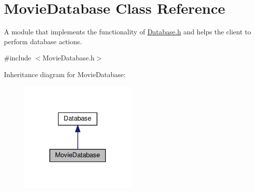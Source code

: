 \hypertarget{classMovieDatabase}{}\section{Movie\+Database Class Reference}
\label{classMovieDatabase}


A module that implements the functionality of \hyperlink{Database_8h_source}{Database.\+h} and helps the client to perform database actions.  




{\ttfamily \#include $<$Movie\+Database.\+h$>$}



Inheritance diagram for Movie\+Database\+:\nopagebreak
\begin{figure}[H]
\begin{center}
\leavevmode
\includegraphics[width=165pt]{classMovieDatabase__inherit__graph}
\end{center}
\end{figure}


